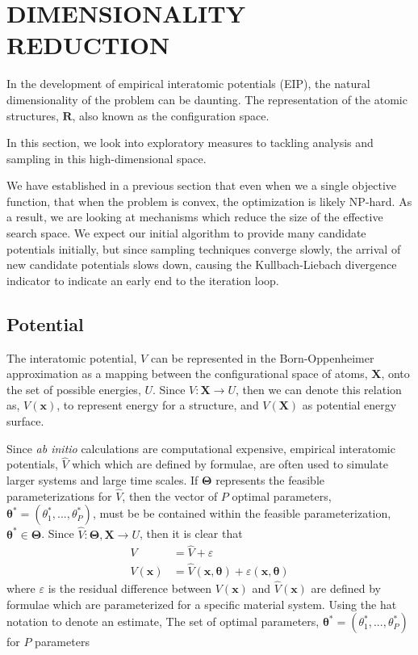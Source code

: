 \chapter{DIMENSIONALITY REDUCTION}

In the development of empirical interatomic potentials (EIP), the natural dimensionality of the problem can be daunting.  The representation of the atomic structures, $\bm{R}$, also known as the configuration space.

In this section, we look into exploratory measures to tackling analysis and sampling in this high-dimensional space.

We have established in a previous section that even when we a single objective function,
that when the problem is convex, the optimization is likely NP-hard.
As a result, we are looking at mechanisms which reduce the size of the effective search space.
We expect our initial algorithm to provide many candidate potentials initially, but since sampling techniques converge slowly, the arrival of new candidate potentials slows down, causing the Kullbach-Liebach divergence indicator to indicate an early end to the iteration loop.

\section{Potential}

The interatomic potential, $V$ can be represented in the Born-Oppenheimer approximation as a mapping between the configurational space of atoms, $\bm{X}$, onto the set of possible energies, $U$.
Since $V:\bm{X} \rightarrow U$, then we can denote this relation as, $V(\bm{x})$, to represent energy for a structure, and $V(\bm{X})$ as potential energy surface.

Since \emph{ab initio} calculations are computational expensive, empirical interatomic potentials, $\hat{V}$ which which are defined by formulae, are often used to simulate larger systems and large time scales.
If $\bm{\Theta}$ represents the feasible parameterizations for $\hat{V}$, then the vector of $P$ optimal parameters, $\bm{\theta}^{*} = (\theta_1^{*},...,\theta_P^{*})$, must be be contained within the feasible parameterization, $\bm{\theta}^{*} \in \bm{\Theta}$.
Since $\hat{V}:\bm{\Theta},\bm{X} \rightarrow U$, then it is clear that
\begin{align}
  V &= \hat{V} + \varepsilon \\
  V(\bm{x}) &= \hat{V}(\bm{x},\bm{\theta}) + \varepsilon(\bm{x},\bm{\theta})
\end{align}
where $\varepsilon$ is the residual difference between $V(\bm{x})$ and $\hat{V}(\bm{x})$
 are defined by formulae which are parameterized for a specific material system.  Using the hat notation to denote an estimate,   The set of optimal parameters, $\bm{\theta}^{*} = (\theta_1^{*},...,\theta_P^{*})$ for $P$ parameters

